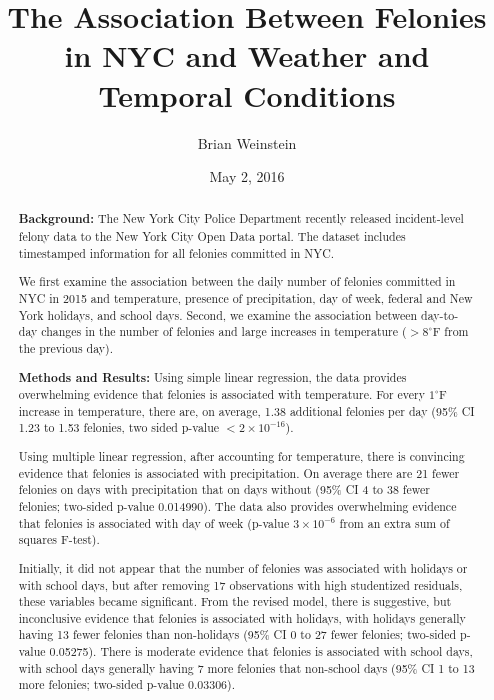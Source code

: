 \documentclass[11pt,notitlepage]{article}
\newcommand{\degf}{^\circ\text{F}}
\begin{document}
\title{The Association Between Felonies in NYC and Weather and Temporal Conditions}
\author{Brian Weinstein}
\date{May 2, 2016}

\maketitle



\begin{abstract}
\singlespacing

\noindent \textbf{Background:} The New York City Police Department recently released incident-level felony data to the New York City Open Data portal. The dataset includes timestamped information for all felonies committed in NYC.

We first examine the association between the daily number of felonies committed in NYC in 2015 and temperature, presence of precipitation, day of week, federal and New York holidays, and school days. Second, we examine the association between day-to-day changes in the number of felonies and large increases in temperature ($>8 \degf$ from the previous day).

\noindent \textbf{Methods and Results:} Using simple linear regression, the data provides overwhelming evidence that felonies is associated with temperature. For every $1 \degf$ increase in temperature, there are, on average, 1.38 additional felonies per day (95\% CI 1.23 to 1.53 felonies, two sided p-value $<2\times10^{-16}$).

Using multiple linear regression, after accounting for temperature, there is convincing evidence that felonies is associated with precipitation. On average there are 21 fewer felonies on days with precipitation that on days without (95\% CI 4 to 38 fewer felonies; two-sided p-value 0.014990). The data also provides overwhelming evidence that felonies is associated with day of week (p-value $3 \times 10^{-6}$ from an extra sum of squares F-test).

Initially, it did not appear that the number of felonies was associated with holidays or with school days, but after removing 17 observations with high studentized residuals, these variables became significant. From the revised model, there is suggestive, but inconclusive evidence that felonies is associated with holidays, with holidays generally having 13 fewer felonies than non-holidays (95\% CI 0 to 27 fewer felonies; two-sided p-value 0.05275). There is moderate evidence that felonies is associated with school days, with school days generally having 7 more felonies that non-school days (95\% CI 1 to 13 more felonies; two-sided p-value 0.03306).


\end{abstract}
\end{document}
